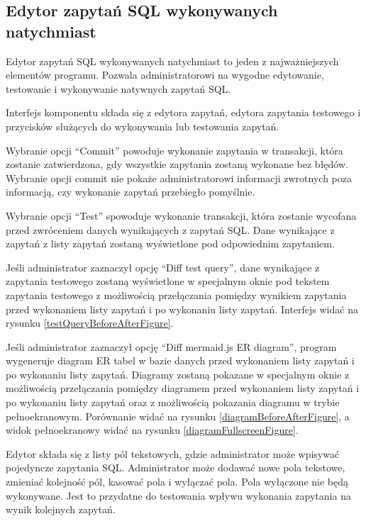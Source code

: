 \clearpage

\subsection{Edytor zapytań SQL wykonywanych natychmiast}

Edytor zapytań SQL wykonywanych natychmiast to jeden z najważniejszych elementów
programu. Pozwala administratorowi na wygodne edytowanie, testowanie i
wykonywanie natywnych zapytań SQL. 

Interfejs komponentu składa się z edytora zapytań, edytora zapytania testowego i
przycisków służących do wykonywania lub testowania zapytań.

Wybranie opcji ``Commit'' powoduje wykonanie zapytania w transakcji, która
zostanie zatwierdzona, gdy wszystkie zapytania zostaną wykonane bez błędów.
Wybranie opcji commit nie pokaże administratorowi informacji zwrotnych poza
informacją, czy wykonanie zapytań przebiegło pomyślnie.

Wybranie opcji ``Test'' spowoduje wykonanie transakcji, która zostanie wycofana
przed zwróceniem danych wynikających z zapytań SQL. Dane wynikające z zapytań z
listy zapytań zostaną wyświetlone pod odpowiednim zapytaniem.

Jeśli administrator zaznaczył opcję ``Diff test query'', dane wynikające z
zapytania testowego zostaną wyświetlone w specjalnym oknie pod tekstem zapytania
testowego z możliwością przełączania pomiędzy wynikiem zapytania przed
wykonaniem listy zapytań i po wykonaniu listy zapytań. Interfejs widać na
rysunku \ref{testQueryBeforeAfterFigure}.

Jeśli administrator zaznaczył opcję ``Diff mermaid.js ER diagram'', program
wygeneruje diagram ER tabel w bazie danych przed wykonaniem listy zapytań i po
wykonaniu listy zapytań. Diagramy zostaną pokazane w specjalnym oknie z
możliwością przełączania pomiędzy diagramem przed wykonaniem listy zapytań i po
wykonaniu listy zapytań oraz z możliwością pokazania diagramu w trybie
pełnoekranowym. Porównanie widać na rysunku \ref{diagramBeforeAfterFigure}, a
widok pełnoekranowy widać na rysunku \ref{diagramFullscreenFigure}.

Edytor składa się z listy pól tekstowych, gdzie administrator może wpisywać
pojedyncze zapytania SQL. Administrator może dodawać nowe pola tekstowe,
zmieniać kolejność pól, kasować pola i wyłączać pola. Pola wyłączone nie będą
wykonywane. Jest to przydatne do testowania wpływu wykonania zapytania na wynik
kolejnych zapytań.

